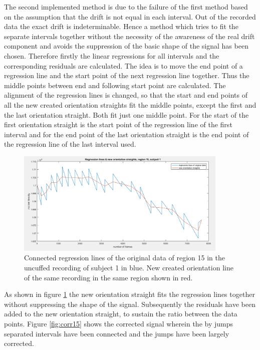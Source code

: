 The second implemented method is due to the failure of the first method based on the assumption that the drift is not equal in each interval. Out of the recorded data the exact drift is indeterminable. Hence a method which tries to fit the separate intervals together without the necessity of the awareness of the real drift component and avoids the suppression of the basic shape of the signal has been chosen.
Therefore firstly the linear regressions for all intervals and the corresponding residuals are calculated.
The idea is to move the end point of a regression line and the start point of the next regression line together. Thus the middle points between end and following start point are calculated. The alignment of the regression lines is changed, so that the start and end points of all the new created orientation straights fit the middle points, except the first and the last orientation straight. Both fit just one middle point. For the start of the first orientation straight is the start point of the regression line of the first interval and for the end point of the last orientation straight is the end point of the regression line of the last interval used.
\begin{figure}[H]
	\includegraphics[width=0.9\textwidth]{figures/reg15}
	\caption{Connected regression lines of the original data of region 15 in the uncuffed recording of subject 1 in blue. New created orientation line of the same recording in the same region shown in red.}
	\label{fig:reg15}
\end{figure}
As shown in figure \ref{fig:reg15} the new orientation straight fits the regression lines together without suppressing the shape of the signal. Subsequently the residuals have been added to the new orientation straight, to sustain the ratio between the data points. Figure \ref{fig:corr15} shows the corrected signal wherein the by jumps separated intervals have been connected and the jumps have been largely corrected.
